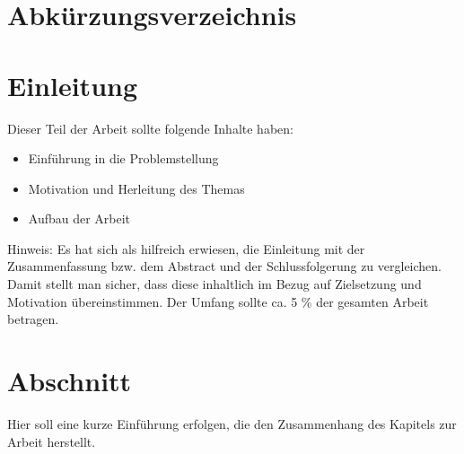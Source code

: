 \documentclass[12pt,oneside]{article}
\begin{document}
\newpage
{} %
\listoftables
\newpage

\setlength{\parskip}{0.5em} 


\section*{Abkürzungsverzeichnis} %

\begin{acronym}
\end{acronym}

\clearpage
{}  
    \setcounter{page}{1}
\lhead{\nouppercase{\leftmark}}


\section{Einleitung} \label{einleitung}
Dieser Teil der Arbeit sollte folgende Inhalte haben:

\begin{itemize}
\item Einführung in die Problemstellung
\item Motivation und Herleitung des Themas
\item Aufbau der Arbeit
\end{itemize}

Hinweis:
Es hat sich als hilfreich erwiesen, die Einleitung mit der Zusammenfassung bzw. dem  Abstract und der Schlussfolgerung zu vergleichen. Damit stellt man sicher, dass diese inhaltlich im Bezug auf Zielsetzung und Motivation übereinstimmen. Der Umfang sollte ca. 5 \% der gesamten Arbeit betragen.


\section{Abschnitt} 
Hier soll eine kurze Einführung erfolgen, die den Zusammenhang des Kapitels zur Arbeit herstellt.
\end{document}
